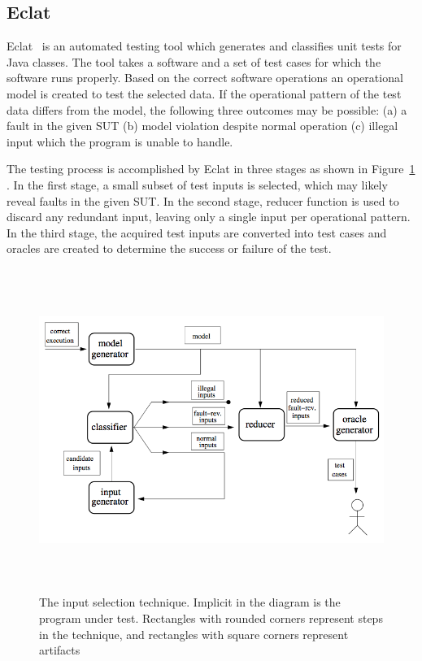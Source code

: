 \subsection{Eclat}
Eclat~\cite{pacheco2005eclat} is an automated testing tool which generates and classifies unit tests for Java classes. The tool takes a software and a set of test cases for which the software runs properly. Based on the correct software operations an operational model is created to test the selected data. If the operational pattern of the test data differs from the model, the following three outcomes may be possible: (a) a fault in the given SUT (b) model violation despite normal operation (c) illegal input which the program is unable to handle.

The testing process is accomplished by Eclat in three stages as shown in Figure~\ref{fig:eclat} . In the first stage, a small subset of test inputs is selected, which may likely reveal faults in the given SUT. In the second stage, reducer function is used to discard any redundant input, leaving only a single input per operational pattern. In the third stage, the acquired test inputs are converted into test cases and oracles are created to determine the success or failure of the test.
\bigskip
\bigskip
\begin{figure}[h]
	\centering
	\includegraphics[width=15cm, height=10.5cm]{chapter2/eclat_working.png}
	\bigskip
	\caption{The input selection technique. Implicit in the diagram is the program under test. Rectangles with rounded corners represent steps in the technique, and rectangles with square corners represent artifacts~\cite{pacheco2005eclat}}
	\label{fig:eclat}
\end{figure}
\bigskip

